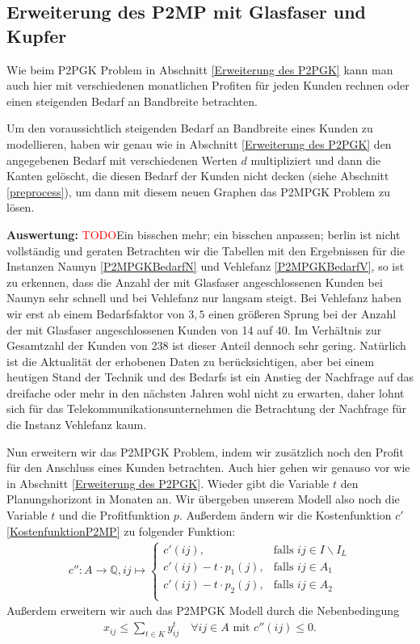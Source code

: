 \documentclass[11pt,a4paper]{article}
\newcommand{\Q}{\mathbb{Q}}
\newcommand{\TODO}{\textcolor{red}{TODO}}
\theoremstyle{my_th_style1}
\begin{document}
 \subsection{Erweiterung des P2MP mit Glasfaser und Kupfer}
Wie beim P2PGK Problem in Abschnitt \ref{Erweiterung des P2PGK} kann man auch hier mit verschiedenen monatlichen Profiten f\"ur jeden Kunden rechnen oder einen steigenden Bedarf an Bandbreite betrachten.
 
Um den voraussichtlich steigenden Bedarf an Bandbreite eines Kunden zu modellieren, haben wir genau wie in Abschnitt \ref{Erweiterung des P2PGK} den angegebenen Bedarf mit verschiedenen Werten $d$ multipliziert und dann die Kanten gel\"oscht, die diesen Bedarf der Kunden nicht decken (siehe Abschnitt \ref{preprocess}), um dann mit diesem neuen Graphen das P2MPGK Problem zu l\"osen.
 
 \textbf{Auswertung:} \TODO Ein bisschen mehr; ein bisschen anpassen; berlin ist nicht vollständig und geraten
 Betrachten wir die Tabellen mit den Ergebnissen f\"ur die Instanzen Naunyn \eqref{P2MPGKBedarfN} und Vehlefanz \eqref{P2MPGKBedarfV}, so ist zu erkennen, dass die Anzahl der mit Glasfaser angeschlossenen Kunden bei Naunyn sehr schnell und bei Vehlefanz nur langsam steigt.
Bei Vehlefanz haben wir erst ab einem Bedarfsfaktor von \(3,5\) einen gr\"oßeren Sprung bei der Anzahl der mit Glasfaser angeschlossenen Kunden von 14 auf 40.
Im Verh\"altnis zur Gesamtzahl der Kunden von 238 ist dieser Anteil dennoch sehr gering.
Nat\"urlich ist die Aktualit\"at der erhobenen Daten zu ber\"ucksichtigen, aber bei einem heutigen Stand der Technik und des Bedarfs ist ein Anstieg der Nachfrage auf das dreifache oder mehr in den n\"achsten Jahren wohl nicht zu erwarten, daher lohnt sich f\"ur das Telekommunikationsunternehmen die Betrachtung der Nachfrage f\"ur die Instanz Vehlefanz kaum. 
  
Nun erweitern wir das P2MPGK Problem, indem wir zusätzlich noch den Profit für den Anschluss eines Kunden betrachten.
Auch hier gehen wir genauso vor wie in Abschnitt \ref{Erweiterung des P2PGK}.
Wieder gibt die Variable $t$ den Planungshorizont in Monaten an.
Wir \"ubergeben unserem Modell also noch die Variable $t$ und die Profitfunktion $p$.
Außerdem \"andern wir die Kostenfunktion \(c'\) \eqref{KostenfunktionP2MP}  zu folgender Funktion:
\begin{align*}
  c'': A  \rightarrow \Q,  ij  \mapsto \left\{\begin{array}{cl} 
 c'(ij), & \text{falls } ij \in I\backslash I_L \\ 
  c'(ij) -t  \cdot p_1(j), & \text{falls } ij \in A_1 \\ 
    c'(ij) -t \cdot p_2(j), & \text{falls } ij \in  A_2 \\ 
\end{array}  \right.
\end{align*}
Außerdem erweitern wir auch das P2MPGK Modell durch die Nebenbedingung 
\begin{align*}
 x_{ij} \leq \displaystyle\sum_{t \in K} y_{ij}^t \quad \forall ij \in A \text{ mit } c''(ij) \leq 0.
\end{align*}
\end{document}
